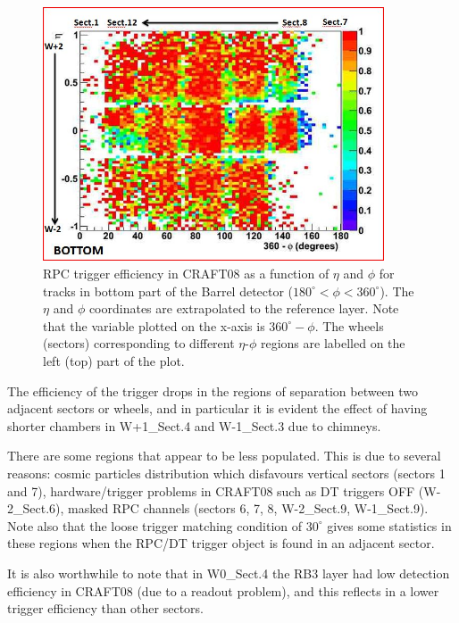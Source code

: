 \begin{figure}[hbtp]
     \begin{center}
      \includegraphics[width=0.9\textwidth]{eff_eta_phi_bot_08_new}
      \hspace{1cm}
      \caption{RPC trigger efficiency in CRAFT08 as a function of $\eta$ and $\phi$ 
      for tracks in bottom part of the Barrel detector 
      ($ 180^\circ < \phi < 360^\circ $). The $\eta$ and $\phi$ coordinates are 
      extrapolated to the reference layer. 
      Note that the variable plotted on the x-axis is 
      $360^\circ - \phi$. The wheels (sectors) corresponding to different $\eta$-$\phi$
      regions are labelled on the left (top) part of the plot.
      }
    \label{fig:eff_eta_phi_bot_08}
  \end{center}
\end{figure}

The efficiency of the trigger drops in the regions
of separation between two adjacent sectors or wheels,
and in particular it is evident the effect of having
shorter chambers in W+1\_Sect.4 and W-1\_Sect.3 due to 
chimneys.

There are some regions that appear to be less populated.
This is due to several reasons: cosmic particles 
distribution which disfavours vertical sectors
(sectors 1 and 7), hardware/trigger problems in CRAFT08
such as DT triggers OFF (W-2\_Sect.6),
masked RPC channels (sectors 6, 7, 8, W-2\_Sect.9,
W-1\_Sect.9). Note also that the loose trigger 
matching condition of $30^\circ$
gives some statistics in these regions
when the RPC/DT trigger object is found in an adjacent
sector.

It is also worthwhile to note that in W0\_Sect.4 the RB3 layer
had low detection efficiency in CRAFT08 (due to a readout problem), 
and this reflects in a lower trigger efficiency than other sectors.

